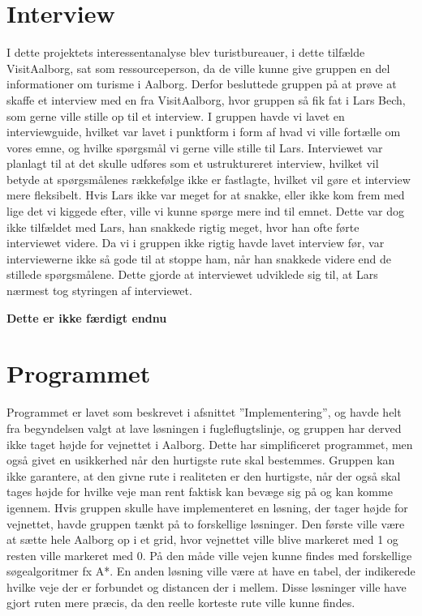 \section{Interview}
I dette projektets interessentanalyse blev turistbureauer, i dette tilfælde VisitAalborg, sat som ressourceperson, da de ville kunne give gruppen en del informationer om turisme i Aalborg. Derfor besluttede gruppen på at prøve at skaffe et interview med en fra VisitAalborg, hvor gruppen så fik fat i Lars Bech, som gerne ville stille op til et interview. I gruppen havde vi lavet en interviewguide, hvilket var lavet i punktform i form af hvad vi ville fortælle om vores emne, og hvilke spørgsmål vi gerne ville stille til Lars. Interviewet var planlagt til at det skulle udføres som et ustruktureret interview, hvilket vil betyde at spørgsmålenes rækkefølge ikke er fastlagte, hvilket vil gøre et interview mere fleksibelt. Hvis Lars ikke var meget for at snakke, eller ikke kom frem med lige det vi kiggede efter, ville vi kunne spørge mere ind til emnet. Dette var dog ikke tilfældet med Lars, han snakkede rigtig meget, hvor han ofte førte interviewet videre. Da vi i gruppen ikke rigtig havde lavet interview før, var interviewerne ikke så gode til at stoppe ham, når han snakkede videre end de stillede spørgsmålene. Dette gjorde at interviewet udviklede sig til, at Lars nærmest tog styringen af interviewet.

\textbf{Dette er ikke færdigt endnu}
\section{Programmet}
Programmet er lavet som beskrevet i afsnittet ”Implementering”, og havde helt fra begyndelsen valgt at lave løsningen i fugleflugtslinje, og gruppen har derved ikke taget højde for vejnettet i Aalborg. Dette har simplificeret programmet, men også givet en usikkerhed når den hurtigste rute skal bestemmes. Gruppen kan ikke garantere, at den givne rute i realiteten er den hurtigste, når der også skal tages højde for hvilke veje man rent faktisk kan bevæge sig på og kan komme igennem. 
Hvis gruppen skulle have implementeret en løsning, der tager højde for vejnettet, havde gruppen tænkt på to forskellige løsninger. Den første ville være at sætte hele Aalborg op i et grid, hvor vejnettet ville blive markeret med 1 og resten ville markeret med 0. På den måde ville vejen kunne findes med forskellige søgealgoritmer fx A*. En anden løsning ville være at have en tabel, der indikerede hvilke veje der er forbundet og distancen der i mellem. Disse løsninger ville have gjort ruten mere præcis, da den reelle korteste rute ville kunne findes. 

